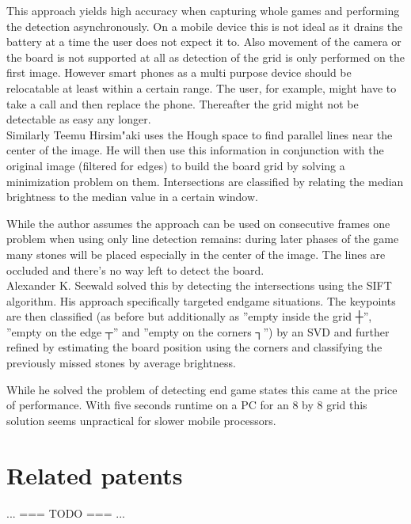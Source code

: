 	This approach yields high accuracy when capturing whole games and performing the detection asynchronously. On a mobile device this is not ideal as it drains the battery at a time the user does not expect it to. Also movement of the camera or the board is not supported at all as detection of the grid is only performed on the first image. However smart phones as a multi purpose device should be relocatable at least within a certain range. The user, for example, might have to take a call and then replace the phone. Thereafter the grid might not be detectable as easy any longer.
	\\

	Similarly Teemu Hirsim"aki \cite{hirsimaki2005extracting} uses the Hough space to find parallel lines near the center of the image. He will then use this information in conjunction with the original image (filtered for edges) to build the board grid by solving a minimization problem on them. Intersections are classified by relating the median brightness to the median value in a certain window.

	While the author assumes the approach can be used on consecutive frames one problem when using only line detection remains: during later phases of the game many stones will be placed especially in the center of the image. The lines are occluded and there's no way left to detect the board.
	\\

	Alexander K. Seewald \cite{seewald2010automatic} solved this by detecting the intersections using the SIFT algorithm. His approach specifically targeted endgame situations. The keypoints are then classified (as before but additionally as ''empty inside the grid ┼'', ''empty on the edge ┬'' and ''empty on the corners ┐'') by an SVD and further refined by estimating the board position using the corners and classifying the previously missed stones by average brightness.

	While he solved the problem of detecting end game states this came at the price of performance. With five seconds runtime on a PC for an 8 by 8 grid this solution seems unpractical for slower mobile processors.

	\section{Related patents}
	\label{introduction-patents}

	... === TODO === ...

